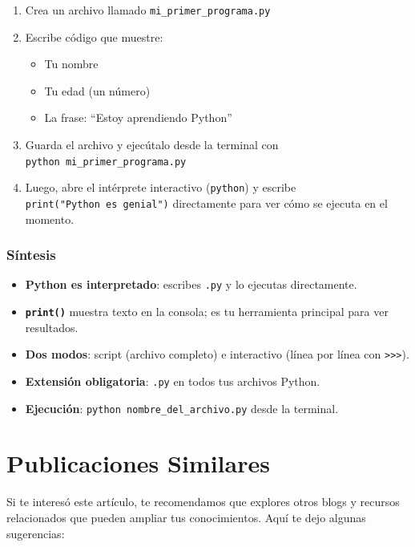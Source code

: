 \documentclass[
  doc,
  floatsintext,
  longtable,
  a4paper,
  nolmodern,
  notxfonts,
  notimes,
  12pt,
  colorlinks=true,linkcolor=blue,citecolor=blue,urlcolor=blue]{apa7}
\providecommand{\tightlist}{%
  \setlength{\itemsep}{0pt}\setlength{\parskip}{0pt}}
\begin{document}
\begin{enumerate}
\def\labelenumi{\arabic{enumi}.}
\tightlist
\item
  Crea un archivo llamado \texttt{mi\_primer\_programa.py}
\item
  Escribe código que muestre:

  \begin{itemize}
  \tightlist
  \item
    Tu nombre
  \item
    Tu edad (un número)
  \item
    La frase: ``Estoy aprendiendo Python''
  \end{itemize}
\item
  Guarda el archivo y ejecútalo desde la terminal con
  \texttt{python\ mi\_primer\_programa.py}
\item
  Luego, abre el intérprete interactivo (\texttt{python}) y escribe
  \texttt{print("Python\ es\ genial")} directamente para ver cómo se
  ejecuta en el momento.
\end{enumerate}

\subsubsection{Síntesis}\label{suxedntesis}

\begin{itemize}
\tightlist
\item
  \textbf{Python es interpretado}: escribes \texttt{.py} y lo ejecutas
  directamente.
\item
  \textbf{\texttt{print()}} muestra texto en la consola; es tu
  herramienta principal para ver resultados.
\item
  \textbf{Dos modos}: script (archivo completo) e interactivo (línea por
  línea con \texttt{\textgreater{}\textgreater{}\textgreater{}}).
\item
  \textbf{Extensión obligatoria}: \texttt{.py} en todos tus archivos
  Python.
\item
  \textbf{Ejecución}: \texttt{python\ nombre\_del\_archivo.py} desde la
  terminal.
\end{itemize}

\section{Publicaciones Similares}\label{publicaciones-similares}

Si te interesó este artículo, te recomendamos que explores otros blogs y
recursos relacionados que pueden ampliar tus conocimientos. Aquí te dejo
algunas sugerencias:
\end{document}

